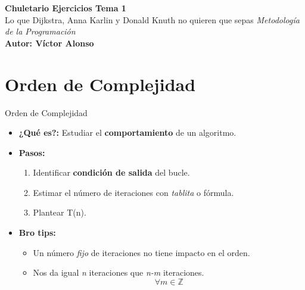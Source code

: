 \documentclass[aspectratio=169]{beamer}
\begin{document}
\begin{frame}
    \centering
    \vspace{1.5cm}
    \Huge \textbf{Chuletario Ejercicios Tema 1} \\
    \Large Lo que Dijkstra, Anna Karlin y Donald Knuth no quieren que sepas
    \vfill
    \normalsize \textit{Metodología de la Programación} \\
    \small \textbf{Autor: Víctor Alonso} %
\end{frame}

\section{Orden de Complejidad}

\begin{frame}{Orden de Complejidad}
    \begin{itemize}
        \item \textbf{¿Qué es?:} Estudiar el \textbf{comportamiento} de un algoritmo.
        \item \textbf{Pasos:}
        \begin{enumerate}
            \item Identificar \textbf{condición de salida} del bucle.
            \item Estimar el número de iteraciones con \textit{tablita} o fórmula.
            
            \item Plantear T(n).
        \end{enumerate}
        \item \textbf{Bro tips:} 
       \begin{itemize}
            \item Un número \textit{fijo} de iteraciones no tiene impacto en el orden.
            \item Nos da igual \textit{n} iteraciones que \textit{n-m} iteraciones.
            \[
                \forall m \in \mathbb{Z}
            \]
        \end{itemize}
    \end{itemize}
\end{frame}
\end{document}
